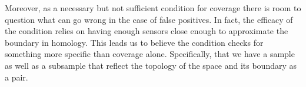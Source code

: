 Moreover, as a necessary but not sufficient condition for coverage there is room to question what can go wrong in the case of false positives.
In fact, the efficacy of the condition relies on having enough sensors close enough to approximate the boundary in homology.
This leads us to believe the condition checks for something more specific than coverage alone.
Specifically, that we have a sample as well as a subsample that reflect the topology of the space and its boundary as a pair.
